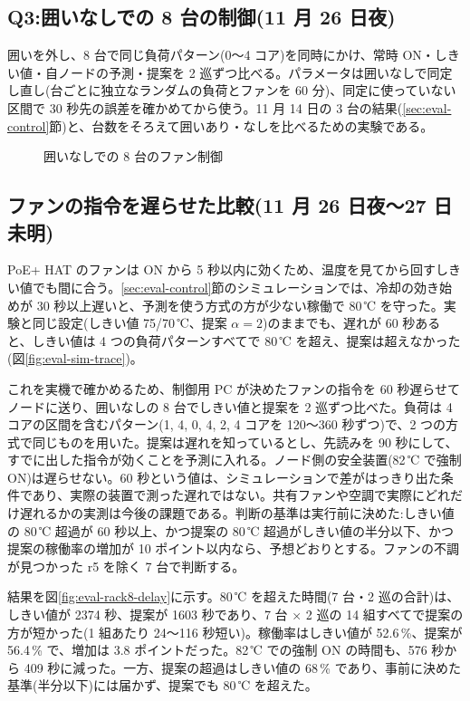 \subsection{Q3:囲いなしでの 8 台の制御(11 月 26 日夜)}
囲いを外し、8 台で同じ負荷パターン(0〜4 コア)を同時にかけ、常時 ON・しきい値・自ノードの予測・提案を 2 巡ずつ比べる。パラメータは囲いなしで同定し直し(台ごとに独立なランダムの負荷とファンを 60 分)、同定に使っていない区間で 30 秒先の誤差を確かめてから使う。11 月 14 日の 3 台の結果(\ref{sec:eval-control}節)と、台数をそろえて囲いあり・なしを比べるための実験である。

\begin{figure}[tb]
  \centering
  \caption{囲いなしでの 8 台のファン制御}
  \label{fig:eval-rack8-open}
\end{figure}

\subsection{ファンの指令を遅らせた比較(11 月 26 日夜〜27 日未明)}
PoE+ HAT のファンは ON から 5 秒以内に効くため、温度を見てから回すしきい値でも間に合う。\ref{sec:eval-control}節のシミュレーションでは、冷却の効き始めが 30 秒以上遅いと、予測を使う方式の方が少ない稼働で 80\,℃ を守った。実験と同じ設定(しきい値 75/70\,℃、提案 $\alpha = 2$)のままでも、遅れが 60 秒あると、しきい値は 4 つの負荷パターンすべてで 80\,℃ を超え、提案は超えなかった(図\ref{fig:eval-sim-trace})。

これを実機で確かめるため、制御用 PC が決めたファンの指令を 60 秒遅らせてノードに送り、囲いなしの 8 台でしきい値と提案を 2 巡ずつ比べた。負荷は 4 コアの区間を含むパターン(1, 4, 0, 4, 2, 4 コアを 120〜360 秒ずつ)で、2 つの方式で同じものを用いた。提案は遅れを知っているとし、先読みを 90 秒にして、すでに出した指令が効くことを予測に入れる。ノード側の安全装置(82\,℃ で強制 ON)は遅らせない。60 秒という値は、シミュレーションで差がはっきり出た条件であり、実際の装置で測った遅れではない。共有ファンや空調で実際にどれだけ遅れるかの実測は今後の課題である。判断の基準は実行前に決めた:しきい値の 80\,℃ 超過が 60 秒以上、かつ提案の 80\,℃ 超過がしきい値の半分以下、かつ提案の稼働率の増加が 10 ポイント以内なら、予想どおりとする。ファンの不調が見つかった r5 を除く 7 台で判断する。

結果を図\ref{fig:eval-rack8-delay}に示す。80\,℃ を超えた時間(7 台・2 巡の合計)は、しきい値が 2374 秒、提案が 1603 秒であり、7 台 × 2 巡の 14 組すべてで提案の方が短かった(1 組あたり 24〜116 秒短い)。稼働率はしきい値が 52.6\,\%、提案が 56.4\,\% で、増加は 3.8 ポイントだった。82\,℃ での強制 ON の時間も、576 秒から 409 秒に減った。一方、提案の超過はしきい値の 68\,\% であり、事前に決めた基準(半分以下)には届かず、提案でも 80\,℃ を超えた。

